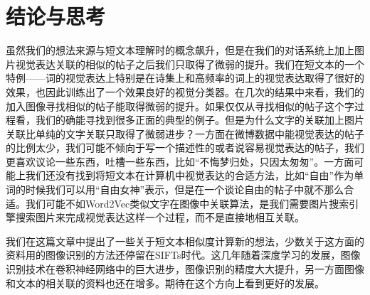 \chapter{结论与思考}


虽然我们的想法来源与短文本理解时的概念飙升，但是在我们的对话系统上加上图片视觉表达关联的相似的帖子之后我们只取得了微弱的提升。我们在短文本的一个特例——词的视觉表达上特别是在诗集上和高频率的词上的视觉表达取得了很好的效果，也因此训练出了一个效果良好的视觉分类器。在几次的结果中来看，我们的加入图像寻找相似的帖子能取得微弱的提升。如果仅仅从寻找相似的帖子这个字过程看，我们的确能寻找到很多正面的典型的例子。但是为什么文字的关联加上图片关联比单纯的文字关联只取得了微弱进步？一方面在微博数据中能视觉表达的帖子的比例太少，我们可能不倾向于写一个描述性的或者说容易视觉表达的帖子，我们更喜欢议论一些东西，吐槽一些东西，比如“不悔梦归处，只因太匆匆”。一方面可能上我们还没有找到将短文本在计算机中视觉表达的合适方法，比如“自由”作为单词的时候我们可以用“自由女神”表示，但是在一个谈论自由的帖子中就不那么合适。我们可能不如Word2Vec类似文字在图像中关联算法，是我们需要图片搜索引擎搜索图片来完成视觉表达这样一个过程，而不是直接地相互关联。

我们在这篇文章中提出了一些关于短文本相似度计算新的想法，少数关于这方面的资料用的图像识别的方法还停留在SIFTs时代。这几年随着深度学习的发展，图像识别技术在卷积神经网络中的巨大进步，图像识别的精度大大提升，另一方面图像和文本的相关联的资料也还在增多。期待在这个方向上看到更好的发展。

